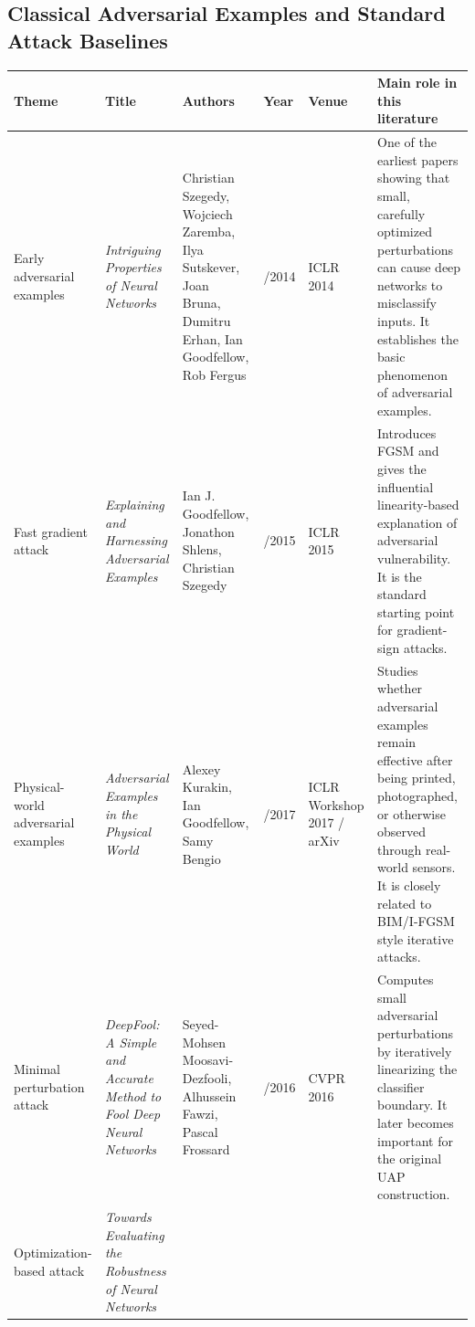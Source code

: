 \documentclass{article}
\begin{document}
\subsection{Classical Adversarial Examples and Standard Attack Baselines}

\begin{landscape}
\begin{table}[p]
\centering
\footnotesize
\begin{tabular}{>{\raggedright\arraybackslash}p{2.4cm} >{\raggedright\arraybackslash}p{4.0cm} >{\raggedright\arraybackslash}p{3.4cm} >{\raggedright\arraybackslash}p{1.0cm} >{\raggedright\arraybackslash}p{3.2cm} >{\raggedright\arraybackslash}p{6.2cm}}
\hline
\textbf{Theme} & \textbf{Title} & \textbf{Authors} & \textbf{Year} & \textbf{Venue} & \textbf{Main role in this literature} \\
\hline
Early adversarial examples &
\textit{Intriguing Properties of Neural Networks} &
Christian Szegedy, Wojciech Zaremba, Ilya Sutskever, Joan Bruna, Dumitru Erhan, Ian Goodfellow, Rob Fergus &
2013/2014 &
ICLR 2014 &
One of the earliest papers showing that small, carefully optimized perturbations can cause deep networks to misclassify inputs. It establishes the basic phenomenon of adversarial examples. \\
\hline
Fast gradient attack &
\textit{Explaining and Harnessing Adversarial Examples} &
Ian J. Goodfellow, Jonathon Shlens, Christian Szegedy &
2014/2015 &
ICLR 2015 &
Introduces FGSM and gives the influential linearity-based explanation of adversarial vulnerability. It is the standard starting point for gradient-sign attacks. \\
\hline
Physical-world adversarial examples &
\textit{Adversarial Examples in the Physical World} &
Alexey Kurakin, Ian Goodfellow, Samy Bengio &
2016/2017 &
ICLR Workshop 2017 / arXiv &
Studies whether adversarial examples remain effective after being printed, photographed, or otherwise observed through real-world sensors. It is closely related to BIM/I-FGSM style iterative attacks. \\
\hline
Minimal perturbation attack &
\textit{DeepFool: A Simple and Accurate Method to Fool Deep Neural Networks} &
Seyed-Mohsen Moosavi-Dezfooli, Alhussein Fawzi, Pascal Frossard &
2015/2016 &
CVPR 2016 &
Computes small adversarial perturbations by iteratively linearizing the classifier boundary. It later becomes important for the original UAP construction. \\
\hline
Optimization-based attack &
\textit{Towards Evaluating the Robustness of Neural Networks} &

\end{tabular}
\end{table}
\end{landscape}
\end{document}
